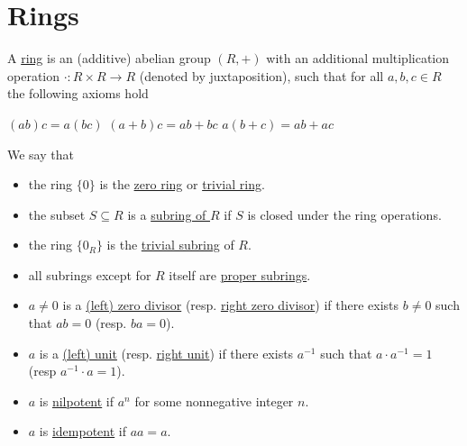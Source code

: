 \section{Rings}\label{sec:rings}

\begin{definition}\label{def:ring}
  A \ul{ring} is an (additive) abelian group $(R, +)$ with an additional multiplication operation $\cdot: R \times R \to R$ (denoted by juxtaposition), such that for all $a, b, c \in R$ the following axioms hold
  \begin{description}
     $(ab)c = a(bc)$
     $(a + b)c = ab + bc$
     $a(b + c) = ab + ac$
  \end{description}

  We say that
  \begin{itemize}
    \item\label{def:ring/trivial_group} the ring $\{ 0 \}$ is the \ul{zero ring} or \ul{trivial ring}.
    \item\label{def:ring/subring} the subset $S \subseteq R$ is a \ul{subring of $R$} if $S$ is closed under the ring operations.
    \item\label{def:ring/trivial_subgroup} the ring $\{ 0_R \}$ is the \ul{trivial subring} of $R$.
    \item\label{def:ring/proper_subring} all subrings except for $R$ itself are \ul{proper subrings}.
    \item\label{def:ring/zero_divisor} $a \neq 0$ is a \ul{(left) zero divisor} (resp. \ul{right zero divisor}) if there exists $b \neq 0$ such that $ab = 0$ (resp. $ba = 0$).
    \item\label{def:ring/unit} $a$ is a \ul{(left) unit} (resp. \ul{right unit}) if there exists $a^{-1}$ such that $a \cdot a^{-1} = 1$ (resp $a^{-1} \cdot a = 1$).
    \item\label{def:ring/nilpotent_element} $a$ is \ul{nilpotent} if $a^n$ for some nonnegative integer $n$.
    \item\label{def:ring/idempotent_element} $a$ is \ul{idempotent} if $aa = a$.
  \end{itemize}


\end{definition}
